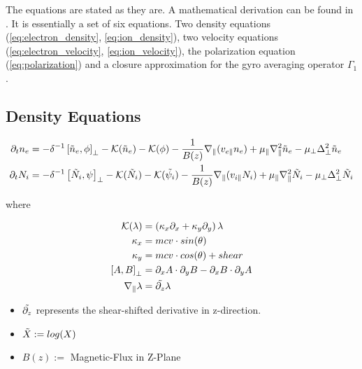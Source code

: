 The equations are stated as they are. A mathematical derivation can be found in \cite{HeldDisseration}. It is essentially a set of six equations. Two density equations (\autoref{eq:electron_density}, \autoref{eq:ion_density}), two velocity equations (\autoref{eq:electron_velocity}, \autoref{eq:ion_velocity}), the polarization equation (\autoref{eq:polarization}) and a closure approximation for the gyro averaging operator $\Gamma_1$.

\subsection{Density Equations}

\begin{align}
    \partial_t n_e &=
    -\delta^{-1} \left[\Tilde{n}_e, \phi \right]_{\perp}
    - \mathcal{K}(\Tilde{n}_e)
    - \mathcal{K}(\phi)
    - \frac{1}{B(z)}\nabla_\parallel (v_{e\parallel} n_e)
    + \mu_\parallel \nabla_\parallel^2\Tilde{n}_e
    - \mu_\perp \Delta^2_\perp\Tilde{n}_e \label{eq:electron_density}
    \\
    \partial_t N_i &=
    -\delta^{-1} \left[\Tilde{N}_i, \psi \right]_{\perp}
    - \mathcal{K}(\Tilde{N}_i)
    - \mathcal{K}(\Tilde{\psi_i})
    - \frac{1}{B(z)}\nabla_\parallel (v_{i\parallel} N_i)
    + \mu_\parallel \nabla_\parallel^2\Tilde{N}_i
    - \mu_\perp \Delta^2_\perp\Tilde{N}_i \label{eq:ion_density}
\end{align}

where

\begin{align}
    \mathcal{K}(\lambda) &= (\kappa_x \partial_x + \kappa_y \partial_y)\,\lambda\\
    \kappa_x &= mcv \cdot sin(\theta)\\
    \kappa_y &= mcv \cdot cos(\theta) + shear\\
    \left[A, B\right]_\perp &= \partial_x A \cdot \partial_y B - \partial_x B \cdot \partial_y A\\
    \nabla_\parallel \lambda &= \Tilde{\partial_{z}} \lambda
\end{align}
\begin{itemize}
    \item $\Tilde{\partial_{z}}$ represents the shear-shifted derivative in z-direction.
    \item $\Tilde{X} := log(X)$
    \item $B(z) := $ Magnetic-Flux in Z-Plane
\end{itemize}


